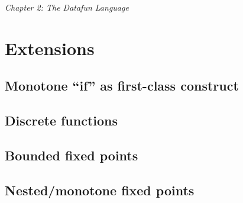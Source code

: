 \emph{Chapter 2: The Datafun Language}











\hypertarget{extensions}{%
\section{Extensions}\label{extensions}}

\hypertarget{monotone-if-as-first-class-construct}{%
\subsection{Monotone ``if'' as first-class
construct}\label{monotone-if-as-first-class-construct}}


\hypertarget{discrete-functions}{%
\subsection{Discrete functions}\label{discrete-functions}}


\hypertarget{bounded-fixed-points}{%
\subsection{Bounded fixed points}\label{bounded-fixed-points}}


\hypertarget{nestedmonotone-fixed-points}{%
\subsection{Nested/monotone fixed
points}\label{nestedmonotone-fixed-points}}

\label{section-nested-fixed-points}

